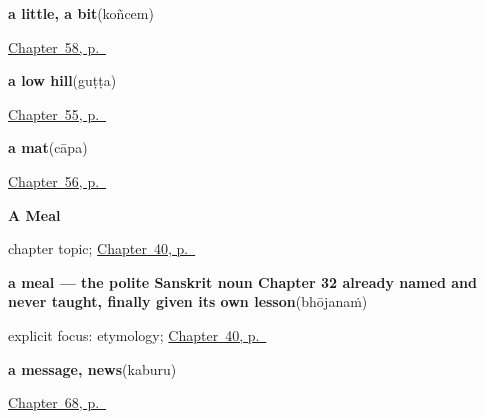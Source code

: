 \noindent\begin{minipage}[t]{\linewidth}
\raggedright
\textbf{a little, a bit}\enspace\emph{}\enspace(koñcem)\par
\footnotesize \hyperref[ch:te-more-replies]{Chapter~58, p.~\pageref*{ch:te-more-replies}}
\end{minipage}\par\smallskip

\noindent\begin{minipage}[t]{\linewidth}
\raggedright
\textbf{a low hill}\enspace\emph{}\enspace(guṭṭa)\par
\footnotesize \hyperref[ch:te-river-road]{Chapter~55, p.~\pageref*{ch:te-river-road}}
\end{minipage}\par\smallskip

\noindent\begin{minipage}[t]{\linewidth}
\raggedright
\textbf{a mat}\enspace\emph{}\enspace(cāpa)\par
\footnotesize \hyperref[ch:te-house]{Chapter~56, p.~\pageref*{ch:te-house}}
\end{minipage}\par\smallskip

\noindent\begin{minipage}[t]{\linewidth}
\raggedright
\textbf{A Meal}\par
\footnotesize chapter topic; \hyperref[ch:te-a-meal]{Chapter~40, p.~\pageref*{ch:te-a-meal}}
\end{minipage}\par\smallskip

\noindent\begin{minipage}[t]{\linewidth}
\raggedright
\textbf{a meal — the polite Sanskrit noun Chapter 32 already named and never taught, finally given its own lesson}\enspace\emph{}\enspace(bhōjanaṁ)\par
\footnotesize explicit focus: etymology; \hyperref[ch:te-a-meal]{Chapter~40, p.~\pageref*{ch:te-a-meal}}
\end{minipage}\par\smallskip

\noindent\begin{minipage}[t]{\linewidth}
\raggedright
\textbf{a message, news}\enspace\emph{}\enspace(kaburu)\par
\footnotesize \hyperref[ch:te-sound-and-voice]{Chapter~68, p.~\pageref*{ch:te-sound-and-voice}}
\end{minipage}\par\smallskip

